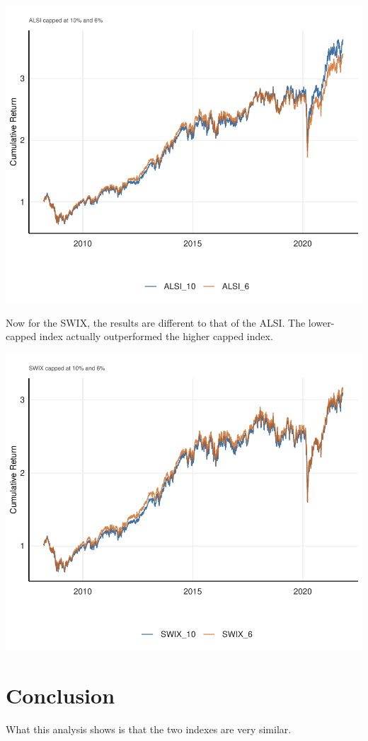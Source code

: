 \documentclass[11pt,preprint, authoryear]{elsarticle}
\numberwithin{equation}{section}
\numberwithin{figure}{section}
\numberwithin{table}{section}
\begin{document}
\includegraphics{Question3_files/figure-latex/unnamed-chunk-16-1.pdf}

Now for the SWIX, the results are different to that of the ALSI. The
lower-capped index actually outperformed the higher capped index.

\includegraphics{Question3_files/figure-latex/unnamed-chunk-18-1.pdf}

\hypertarget{conclusion}{%
\section{Conclusion}\label{conclusion}}

What this analysis shows is that the two indexes are very similar.


\end{document}
